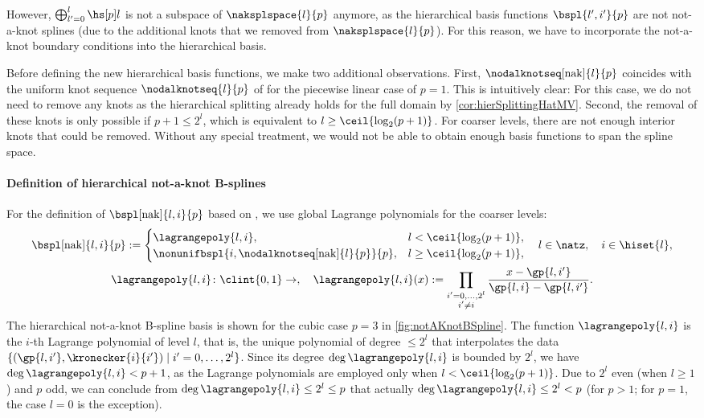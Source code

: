 However, $\bigoplus_{l'=0}^l \hsbspl{l}{p}$ is not a subspace of
$\naksplspace{l}{p}$ anymore,
as the hierarchical basis functions $\bspl{l',i'}{p}$ are not
not-a-knot splines (due to the additional knots that we removed from
$\naksplspace{l}{p}$).
For this reason,
we have to incorporate the not-a-knot boundary conditions into the
hierarchical basis.

Before defining the new hierarchical basis functions,
we make two additional observations.
First, $\nodalknotseq[\nak]{l}{p}$ coincides with the
uniform knot sequence $\nodalknotseq{l}{p}$ of 
for the piecewise linear case of $p = 1$.
This is intuitively clear:
For this case,
we do not need to remove any knots as the hierarchical splitting already
holds for the full domain by \cref{cor:hierSplittingHatMV}.
Second, the removal of these knots is only possible if $p + 1 \le 2^l$,
which is equivalent to $l \ge \ceil{\log_2(p+1)}$.
For coarser levels,
there are not enough interior knots that could be removed.
Without any special treatment,
we would not be able to obtain enough basis functions to span the spline space.

\paragraph{Definition of hierarchical not-a-knot B-splines}

For the definition of 
$\bspl[\nak]{l,i}{p}$ based on ,
we use global Lagrange polynomials for the coarser levels:
\begin{subequations}
   \label{eq:hierarchicalNotAKnotBSpline}
  \begin{gather}
    \bspl[\nak]{l,i}{p}
    :=
    \begin{cases}
      \lagrangepoly{l,i},&
      l < \ceil{\log_2(p+1)},\\
      \nonunifbspl{i,\nodalknotseq[\nak]{l}{p}}{p},&
      l \ge \ceil{\log_2(p+1)},
    \end{cases}\quad
    l \in \natz,\quad
    i \in \hiset{l},\\
    \lagrangepoly{l,i}\colon \clint{0, 1} \to \real,\quad
    \lagrangepoly{l,i}(x)
    := \prod_{\substack{i'=0,\dotsc,2^l\\i'\not=i}}
    \frac{x - \gp{l,i'}}{\gp{l,i} - \gp{l,i'}}.
  \end{gather}
\end{subequations}
The hierarchical not-a-knot B-spline basis is shown for the
cubic case $p = 3$ in \cref{fig:notAKnotBSpline}.
The function $\lagrangepoly{l,i}$ is the $i$-th Lagrange polynomial of level $l$,
that is,
the unique polynomial of degree $\le 2^l$ that interpolates the data
$\{(\gp{l,i'}, \kronecker{i}{i'}) \mid i' = 0, \dotsc, 2^l\}$.
Since its degree $\deg \lagrangepoly{l,i}$ is bounded by $2^l$,
we have $\deg \lagrangepoly{l,i} < p + 1$,
as the Lagrange polynomials are employed only when
$l < \ceil{\log_2(p+1)}$.
Due to $2^l$ even (when $l \ge 1$) and $p$ odd,
we can conclude from $\deg \lagrangepoly{l,i} \le 2^l \le p$ that actually
$\deg \lagrangepoly{l,i} \le 2^l < p$
(for $p > 1$; for $p = 1$, the case $l = 0$ is the exception).

